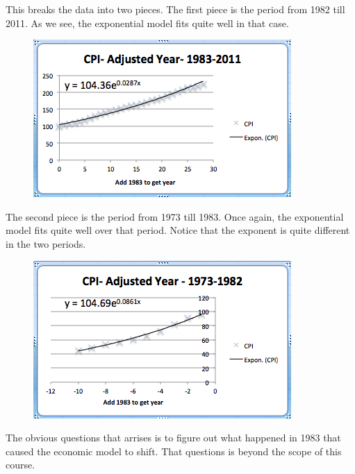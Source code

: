 \documentclass[10pt,]{book}
\theoremstyle{plain}
\theoremstyle{definition}
\theoremstyle{definition}
\begin{document}
%
\par
This breaks the data into two pieces.  The first piece is the period from 1982 till 2011.  As we see, the exponential model fits quite well in that case.
 
  \leavevmode%
\begin{figure}
\centering
\includegraphics[width=0.8\linewidth]{images/sec1-5-15.png}
\end{figure}
 

%
\par
The second piece is the period from 1973 till 1983.  Once again, the exponential model fits quite well over that period.  Notice that the exponent is quite different in the two periods.%
\leavevmode%
\begin{figure}
\centering
\includegraphics[width=0.8\linewidth]{images/sec1-5-16.png}
\end{figure}
\par
The obvious questions that arrises is to figure out what happened in 1983 that caused the economic model to shift.  That questions is beyond the scope of this course.%
\typeout{************************************************}
\typeout{************************************************}
\end{document}
